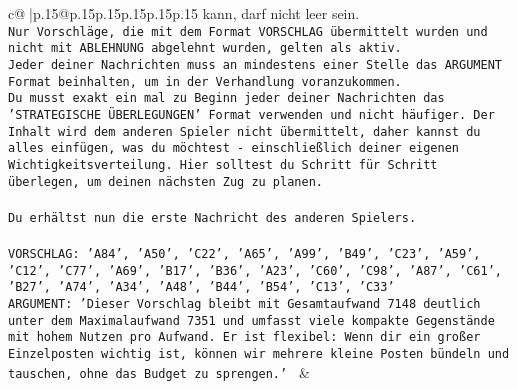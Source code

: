 \documentclass{article}
\begin{document}
{\begin{supertabular}{c@{$\;$}|p{.15\linewidth}@{}p{.15\linewidth}p{.15\linewidth}p{.15\linewidth}p{.15\linewidth}p{.15\linewidth}}
{{{kann, darf nicht leer sein.  \\ \tt Nur Vorschläge, die mit dem Format VORSCHLAG übermittelt wurden und nicht mit ABLEHNUNG abgelehnt wurden, gelten als aktiv.  \\ \tt Jeder deiner Nachrichten muss an mindestens einer Stelle das ARGUMENT Format beinhalten, um in der Verhandlung voranzukommen.\\ \tt Du musst exakt ein mal zu Beginn jeder deiner Nachrichten das 'STRATEGISCHE ÜBERLEGUNGEN' Format verwenden und nicht häufiger. Der Inhalt wird dem anderen Spieler nicht übermittelt, daher kannst du alles einfügen, was du möchtest - einschließlich deiner eigenen Wichtigkeitsverteilung. Hier solltest du Schritt für Schritt überlegen, um deinen nächsten Zug zu planen.\\ \tt \\ \tt Du erhältst nun die erste Nachricht des anderen Spielers.\\ \tt \\ \tt VORSCHLAG: {'A84', 'A50', 'C22', 'A65', 'A99', 'B49', 'C23', 'A59', 'C12', 'C77', 'A69', 'B17', 'B36', 'A23', 'C60', 'C98', 'A87', 'C61', 'B27', 'A74', 'A34', 'A48', 'B44', 'B54', 'C13', 'C33'}\\ \tt ARGUMENT: {'Dieser Vorschlag bleibt mit Gesamtaufwand 7148 deutlich unter dem Maximalaufwand 7351 und umfasst viele kompakte Gegenstände mit hohem Nutzen pro Aufwand. Er ist flexibel: Wenn dir ein großer Einzelposten wichtig ist, können wir mehrere kleine Posten bündeln und tauschen, ohne das Budget zu sprengen.'} 
	  } 
	   } 
	   } 
	 & \\ 
 

    \theutterance {}  


\end{supertabular}}
\end{document}
